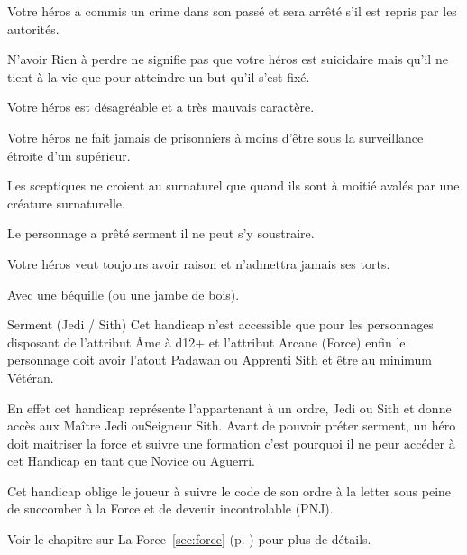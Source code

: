 \begin{description}[align=left]
    \item [Recherché (Mineur ou Majeur)]
        Votre héros a commis un crime dans son passé et sera arrêté s’il est repris par les autorités.

    \item [Rien à perdre (Mineur)]
        N’avoir Rien à perdre ne signifie pas que votre héros est suicidaire mais qu’il ne tient à la vie que pour atteindre un but qu’il s’est fixé.

    \item [Sale caractère (Mineur)]
        Votre héros est désagréable et a très mauvais caractère.

    \item [Sanguinaire (Majeur)]
        Votre héros ne fait jamais de prisonniers à moins d’être sous la surveillance étroite d’un supérieur.

    \item [Sceptique (Mineur)]
        Les sceptiques ne croient au surnaturel que quand ils sont à moitié avalés par une créature surnaturelle.

    \item [Serment (Jedi ou Sith) (Majeur)]
        Le personnage a prêté serment il ne peut s'y soustraire.

    \item [Têtu (Mineur)]
        Votre héros veut toujours avoir raison et n’admettra jamais ses torts.

    \item [Unijambiste (Majeur)]
        Avec une béquille (ou une jambe de bois).

\end{description}

\begin{paperbox}{Serment (Jedi / Sith)}
    Cet handicap n'est accessible que pour les personnages disposant de l'attribut \^Ame à d12+ et l'attribut Arcane (Force) enfin le personnage doit avoir l'atout Padawan ou Apprenti Sith et être au minimum Vétéran. 

    En effet cet handicap représente l'appartenant à un ordre, Jedi ou Sith et donne accès aux Maître Jedi ouSeigneur Sith. Avant de pouvoir préter serment, un héro doit maitriser la force et suivre une formation c'est pourquoi il ne peur accéder à cet Handicap en tant que Novice ou Aguerri.

    Cet handicap oblige le joueur à suivre le code de son ordre à la letter sous peine de succomber à la Force et de devenir incontrolable (PNJ).

    Voir le chapitre sur La Force~\ref{sec:force} (p. \pageref{sec:force}) pour plus de détails.
\end{paperbox}

